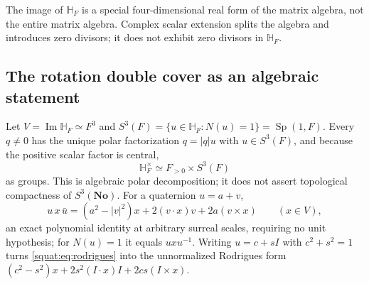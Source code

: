 \documentclass[11pt,letterpaper]{article}
\numberwithin{equation}{section}
\theoremstyle{definition}
\theoremstyle{remark}
\newcommand{\No}{\mathbf{No}}
\newcommand{\HF}{\mathbb H_F}
\newcommand{\Ima}{\operatorname{Im}}
\newcommand{\Sp}{\operatorname{Sp}}
\newcommand{\abs}[1]{\left|#1\right|}
\begin{document}
The image of $\HF$ is a special four-dimensional real form of the matrix algebra, not the
entire matrix algebra. Complex scalar extension splits the algebra and introduces zero
divisors; it does not exhibit zero divisors in $\HF$.

\subsection{The rotation double cover as an algebraic statement}\label{squat:sub:spin}
Let $V=\Ima\HF\simeq F^3$ and $S^3(F)=\{u\in\HF:N(u)=1\}=\Sp(1,F)$. Every $q\ne0$ has
the unique polar factorization $q=\abs qu$ with $u\in S^3(F)$, and because the positive
scalar factor is central,
\begin{equation}\label{squat:eq:polargroup}
 \HF^\times\simeq F_{>0}\times S^3(F)
\end{equation}
as groups. This is algebraic polar decomposition; it does not assert topological
compactness of $S^3(\No)$. For a quaternion $u=a+v$,
\begin{equation}\label{squat:eq:rodrigues}
 u\,x\,\bar u=(a^2-\abs v^2)x+2(v\cdot x)v+2a(v\times x)\qquad(x\in V),
\end{equation}
an exact polynomial identity at arbitrary surreal scales, requiring no unit hypothesis;
for $N(u)=1$ it equals $uxu^{-1}$. Writing $u=c+sI$ with $c^2+s^2=1$ turns
\cref{squat:eq:rodrigues} into the unnormalized Rodrigues form
$(c^2-s^2)x+2s^2(I\cdot x)I+2cs(I\times x)$.
\end{document}
